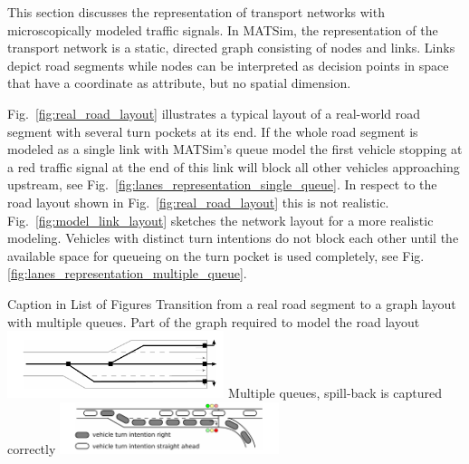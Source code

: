 This section discusses the representation of transport networks with microscopically modeled traffic signals. 
In MATSim, the representation of the transport network is a static, directed graph consisting of nodes and links. 
Links depict road segments while nodes can be interpreted as decision points in space that have a coordinate as attribute, but no spatial dimension. 


Fig.~\ref{fig:real_road_layout} illustrates a typical layout of a real-world road segment with several turn pockets at its end. 
If the whole road segment is modeled as a single link with MATSim's queue model the first vehicle stopping at a red traffic signal at the end of this link will block all other vehicles approaching upstream, see Fig.~\ref{fig:lanes_representation_single_queue}. 
In respect to the road layout shown in Fig.~\ref{fig:real_road_layout} this is not realistic. 
Fig.~\ref{fig:model_link_layout} sketches the network layout for a more realistic modeling. 
Vehicles with distinct turn intentions do not block each other until the available space for queueing on the turn pocket is used completely, see Fig.\ref{fig:lanes_representation_multiple_queue}. 

\createfigure%
{Caption in List of Figures}%
{Transition from a real road segment to a graph layout with multiple queues.}
{\label{fig:lanes_representation}}%
{%
  \createsubfigure%
	{Part of the graph required to model the road layout}
	{\includegraphics[width=0.475\textwidth]{extending/figures/signalslanes/link_lanes_layout}}
	{\label{fig:model_link_layout}}
  \createsubfigure%
	{Multiple queues, spill-back is captured correctly}%
	{\includegraphics[width=0.48\textwidth]{extending/figures/signalslanes/multiple_queue_model_inkscape.pdf}}%
	{\label{fig:lanes_representation_multiple_queue}}%
}%
{\citet{Grether2014PhD}}

